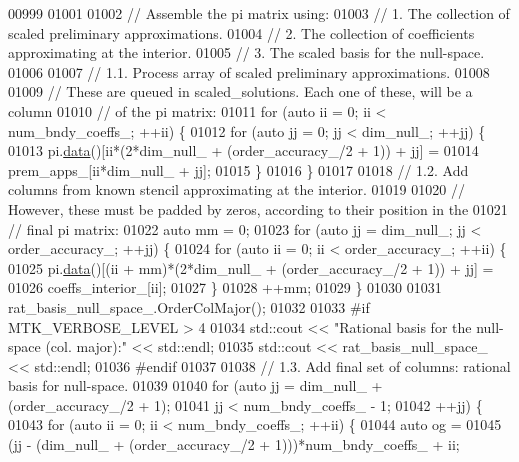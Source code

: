 \begin{DoxyCode}
{{00999 
01001 
01002   \textcolor{comment}{// Assemble the pi matrix using:}
01003   \textcolor{comment}{// 1. The collection of scaled preliminary approximations.}
01004   \textcolor{comment}{// 2. The collection of coefficients approximating at the interior.}
01005   \textcolor{comment}{// 3. The scaled basis for the null-space.}
01006 
01007   \textcolor{comment}{// 1.1. Process array of scaled preliminary approximations.}
01008 
01009   \textcolor{comment}{// These are queued in scaled\_solutions. Each one of these, will be a column}
01010   \textcolor{comment}{// of the pi matrix:}
01011   \textcolor{keywordflow}{for} (\textcolor{keyword}{auto} ii = 0; ii < num\_bndy\_coeffs\_; ++ii) \{
01012     \textcolor{keywordflow}{for} (\textcolor{keyword}{auto} jj = 0; jj < dim\_null\_; ++jj) \{
01013       pi.\hyperlink{classmtk_1_1DenseMatrix_a0c33b8a9e01d157c61ddbdf807c25d84}{data}()[ii*(2*dim\_null\_ + (order\_accuracy\_/2 + 1)) + jj] =
01014         prem\_apps\_[ii*dim\_null\_ + jj];
01015     \}
01016   \}
01017 
01018   \textcolor{comment}{// 1.2. Add columns from known stencil approximating at the interior.}
01019 
01020   \textcolor{comment}{// However, these must be padded by zeros, according to their position in the}
01021   \textcolor{comment}{// final pi matrix:}
01022   \textcolor{keyword}{auto} mm = 0;
01023   \textcolor{keywordflow}{for} (\textcolor{keyword}{auto} jj = dim\_null\_; jj < order\_accuracy\_; ++jj) \{
01024     \textcolor{keywordflow}{for} (\textcolor{keyword}{auto} ii = 0; ii < order\_accuracy\_; ++ii) \{
01025       pi.\hyperlink{classmtk_1_1DenseMatrix_a0c33b8a9e01d157c61ddbdf807c25d84}{data}()[(ii + mm)*(2*dim\_null\_ + (order\_accuracy\_/2 + 1)) + jj] =
01026         coeffs\_interior\_[ii];
01027     \}
01028     ++mm;
01029   \}
01030 
01031   rat\_basis\_null\_space\_.OrderColMajor();
01032 
01033 \textcolor{preprocessor}{  #if MTK\_VERBOSE\_LEVEL > 4}
01034   std::cout << \textcolor{stringliteral}{"Rational basis for the null-space (col. major):"} << std::endl;
01035   std::cout << rat\_basis\_null\_space\_ << std::endl;
01036 \textcolor{preprocessor}{  #endif}
01037 
01038   \textcolor{comment}{// 1.3. Add final set of columns: rational basis for null-space.}
01039 
01040   \textcolor{keywordflow}{for} (\textcolor{keyword}{auto} jj = dim\_null\_ + (order\_accuracy\_/2 + 1);
01041        jj < num\_bndy\_coeffs\_ - 1;
01042        ++jj) \{
01043     \textcolor{keywordflow}{for} (\textcolor{keyword}{auto} ii = 0; ii < num\_bndy\_coeffs\_; ++ii) \{
01044       \textcolor{keyword}{auto} og =
01045         (jj - (dim\_null\_ + (order\_accuracy\_/2 + 1)))*num\_bndy\_coeffs\_ + ii;
}}
\end{DoxyCode}
